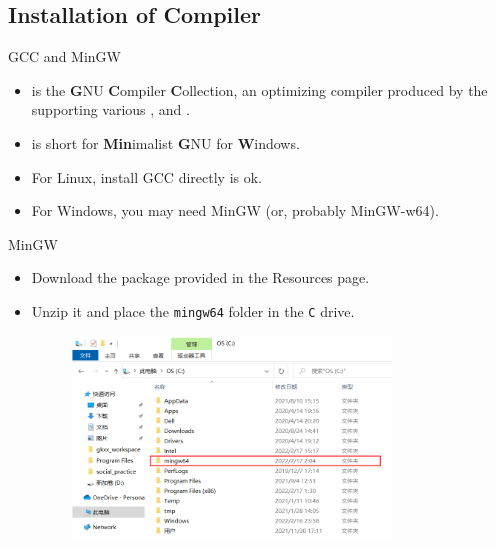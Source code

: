 \documentclass[handout]{beamer}
\begin{document}
\subsection{Installation of Compiler}

\begin{frame}{GCC and MinGW}
    \begin{itemize}
        \item {} is the \textbf{G}NU \textbf{C}ompiler \textbf{C}ollection, an optimizing compiler produced by the  supporting various ,  and .
        \item {} is short for \textbf{Min}imalist \textbf{G}NU for \textbf{W}indows.
        \pause
        \item For Linux, install GCC directly is ok.
        \item For Windows, you may need MinGW (or, probably MinGW-w64).
    \end{itemize}
\end{frame}

\begin{frame}{MinGW}
    \begin{itemize}
        \item Download the package provided in the Resources page.
        \item Unzip it and place the \texttt{mingw64} folder in the \texttt{C} drive.
        \begin{figure}[h]
            \centering
            \includegraphics[width=0.8\textwidth]{img/mingw_in_c.png}
        \end{figure}
    \end{itemize}
\end{frame}
\end{document}
